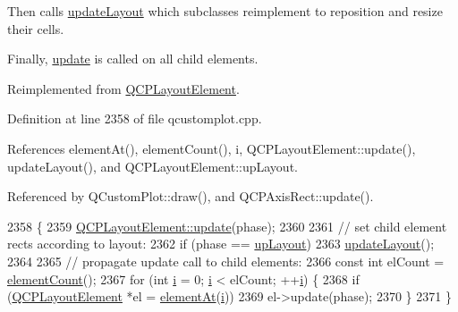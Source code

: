Then calls \hyperlink{class_q_c_p_layout_a165c77f6287ac92e8d03017ad913378b}{update\+Layout} which subclasses reimplement to reposition and resize their cells.

Finally, \hyperlink{class_q_c_p_layout_a34ab477e820537ded7bade4399c482fd}{update} is called on all child elements. 

Reimplemented from \hyperlink{class_q_c_p_layout_element_a929c2ec62e0e0e1d8418eaa802e2af9b}{Q\+C\+P\+Layout\+Element}.



Definition at line 2358 of file qcustomplot.\+cpp.



References element\+At(), element\+Count(), i, Q\+C\+P\+Layout\+Element\+::update(), update\+Layout(), and Q\+C\+P\+Layout\+Element\+::up\+Layout.



Referenced by Q\+Custom\+Plot\+::draw(), and Q\+C\+P\+Axis\+Rect\+::update().


\begin{DoxyCode}
2358                                         \{
2359   \hyperlink{class_q_c_p_layout_element_a929c2ec62e0e0e1d8418eaa802e2af9b}{QCPLayoutElement::update}(phase);
2360 
2361   \textcolor{comment}{// set child element rects according to layout:}
2362   \textcolor{keywordflow}{if} (phase == \hyperlink{class_q_c_p_layout_element_a0d83360e05735735aaf6d7983c56374da5d1ccf5d79967c232c3c511796860045}{upLayout})
2363     \hyperlink{class_q_c_p_layout_a165c77f6287ac92e8d03017ad913378b}{updateLayout}();
2364 
2365   \textcolor{comment}{// propagate update call to child elements:}
2366   \textcolor{keyword}{const} \textcolor{keywordtype}{int} elCount = \hyperlink{class_q_c_p_layout_a39d3e9ef5d9b82ab1885ba1cb9597e56}{elementCount}();
2367   \textcolor{keywordflow}{for} (\textcolor{keywordtype}{int} \hyperlink{_comparision_pictures_2_createtest_image_8m_a6f6ccfcf58b31cb6412107d9d5281426}{i} = 0; \hyperlink{_comparision_pictures_2_createtest_image_8m_a6f6ccfcf58b31cb6412107d9d5281426}{i} < elCount; ++\hyperlink{_comparision_pictures_2_createtest_image_8m_a6f6ccfcf58b31cb6412107d9d5281426}{i}) \{
2368     \textcolor{keywordflow}{if} (\hyperlink{class_q_c_p_layout_element}{QCPLayoutElement} *el = \hyperlink{class_q_c_p_layout_afa73ca7d859f8a3ee5c73c9b353d2a56}{elementAt}(\hyperlink{_comparision_pictures_2_createtest_image_8m_a6f6ccfcf58b31cb6412107d9d5281426}{i}))
2369       el->update(phase);
2370   \}
2371 \}
\end{DoxyCode}


